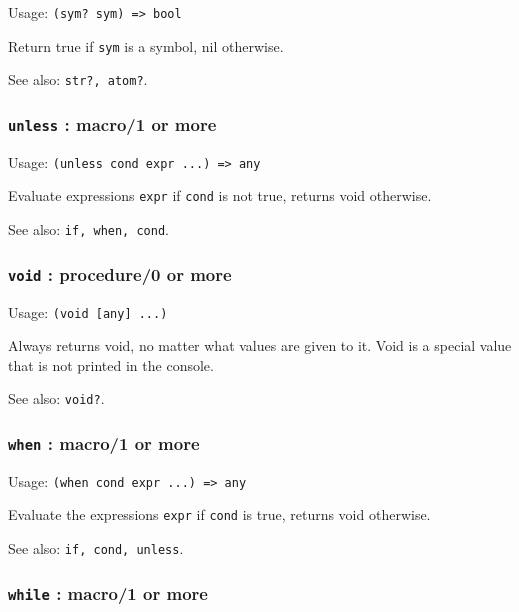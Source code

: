 \documentclass[
]{article}
\newcommand{\passthrough}[1]{#1}
\begin{document}
Usage: \passthrough{\lstinline!(sym? sym) => bool!}

Return true if \passthrough{\lstinline!sym!} is a symbol, nil otherwise.

See also: \passthrough{\lstinline!str?, atom?!}.

\hypertarget{unless-macro1-or-more}{%
\subsubsection{\texorpdfstring{\texttt{unless} : macro/1 or
more}{unless : macro/1 or more}}\label{unless-macro1-or-more}}

Usage: \passthrough{\lstinline!(unless cond expr ...) => any!}

Evaluate expressions \passthrough{\lstinline!expr!} if
\passthrough{\lstinline!cond!} is not true, returns void otherwise.

See also: \passthrough{\lstinline!if, when, cond!}.

\hypertarget{void-procedure0-or-more}{%
\subsubsection{\texorpdfstring{\texttt{void} : procedure/0 or
more}{void : procedure/0 or more}}\label{void-procedure0-or-more}}

Usage: \passthrough{\lstinline!(void [any] ...)!}

Always returns void, no matter what values are given to it. Void is a
special value that is not printed in the console.

See also: \passthrough{\lstinline!void?!}.

\hypertarget{when-macro1-or-more}{%
\subsubsection{\texorpdfstring{\texttt{when} : macro/1 or
more}{when : macro/1 or more}}\label{when-macro1-or-more}}

Usage: \passthrough{\lstinline!(when cond expr ...) => any!}

Evaluate the expressions \passthrough{\lstinline!expr!} if
\passthrough{\lstinline!cond!} is true, returns void otherwise.

See also: \passthrough{\lstinline!if, cond, unless!}.

\hypertarget{while-macro1-or-more}{%
\subsubsection{\texorpdfstring{\texttt{while} : macro/1 or
more}{while : macro/1 or more}}\label{while-macro1-or-more}}
\end{document}
